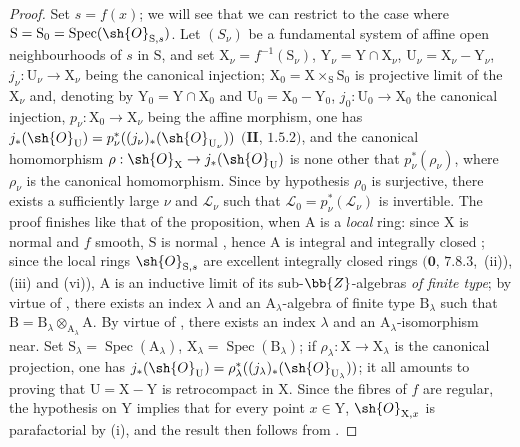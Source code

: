 \begin{proof}
Set $s=f(x)$; we will see that we can restrict to the case where $\mathrm{S}=\mathrm{S}_0=\operatorname{Spec}(\sh{O}_{\mathrm{S},s})$.
Let $(S_\nu)$ be a fundamental system of affine open neighbourhoods of $s$ in $\mathrm{S}$, and set $\mathrm{X}_\nu=f^{-1}(\mathrm{S}_\nu)$, $\mathrm{Y}_\nu=\mathrm{Y}\cap\mathrm{X}_\nu$, $\mathrm{U}_\nu=\mathrm{X}_\nu-\mathrm{Y}_\nu$, $j_\nu:\mathrm{U}_\nu\to\mathrm{X}_\nu$ being the canonical injection; $\mathrm{X}_0=\mathrm{X}\times_{\mathrm{S}}\mathrm{S}_0$ is projective limit of the $\mathrm{X}_\nu$ and, denoting by $\mathrm{Y}_0=\mathrm{Y}\cap\mathrm{X}_0$ and $\mathrm{U}_0=\mathrm{X}_0-\mathrm{Y}_0$, $j_0:\mathrm{U}_0\to\mathrm{X}_0$ the canonical injection, $p_\nu:\mathrm{X}_0\to\mathrm{X}_\nu$ being the affine morphism, one has $j_*(\sh{O}_{\mathrm{U}})=p_\nu^*((j_\nu)_*(\sh{O}_{\mathrm{U}_\nu}))$ $(\mathbf{II}$, $1.5.2)$, and the canonical homomorphism $\rho:\sh{O}_{\mathrm{X}}\to j_*(\sh{O}_{\mathrm{U}})$ is none other that $p_\nu^*(\rho_\nu)$, where $\rho_\nu$ is the canonical homomorphism.
Since by hypothesis $\rho_0$ is surjective, there exists a sufficiently large $\nu$ and $\mathscr{L}_\nu$ such that $\mathscr{L}_0=p_\nu^*(\mathscr{L}_\nu)$ is invertible. The proof finishes like that of the proposition, when $\mathrm{A}$ is a \emph{local} ring: since $\mathrm{X}$ is normal and $f$ smooth, $\mathrm{S}$ is normal , hence $\mathrm{A}$ is integral and integrally closed ; since the local rings $\sh{O}_{\mathrm{S},s}$ are excellent integrally closed rings $(\mathbf{0}$, $7.8.3$,~(ii)), (iii) and (vi)), $\mathrm{A}$ is an inductive limit of its sub-$\bb{Z}$-algebras \emph{of finite type}; by virtue of , there exists an index $\lambda$ and an $\mathrm{A}_\lambda$-algebra of finite type $\mathrm{B}_\lambda$ such that $\mathrm{B}=\mathrm{B}_\lambda\otimes_{\mathrm{A}_\lambda}\mathrm{A}$.
By virtue of , there exists an index $\lambda$ and an $\mathrm{A}_\lambda$-isomorphism near.
Set $\mathrm{S}_\lambda=\operatorname{Spec}(\mathrm{A}_\lambda)$, $\mathrm{X}_\lambda=\operatorname{Spec}(\mathrm{B}_\lambda)$; if $\rho_\lambda:\mathrm{X}\to\mathrm{X}_\lambda$ is the canonical projection, one has $j_*(\sh{O}_{\mathrm{U}})=\rho_\lambda^*((j_\lambda)_*(\sh{O}_{\mathrm{U}_\lambda}))$; it all amounts to proving that $\mathrm{U}=\mathrm{X}-\mathrm{Y}$ is retrocompact in $\mathrm{X}$.
Since the fibres of $f$ are regular, the hypothesis on $\mathrm{Y}$ implies that for every point $x\in\mathrm{Y}$, $\sh{O}_{\mathrm{X},x}$ is parafactorial by (i), and the result then follows from .
\end{proof}

